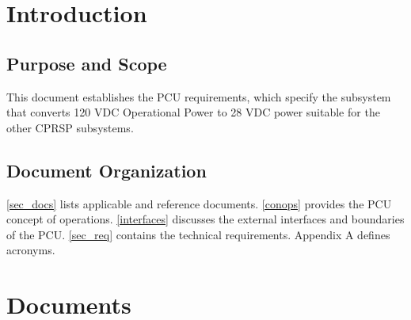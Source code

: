 













\chapter{Introduction }
\label{introduction}

\section{Purpose and Scope }
\label{purposeandscope}

This document establishes the \gls{PCU} requirements, which specify the subsystem that converts 120 \gls{VDC} Operational Power to 28 \gls{VDC} power suitable for the other \gls{CPRSP} subsystems.

\section{Document Organization }
\label{documentorganization}

\autoref{sec_docs} lists applicable and reference documents. \autoref{conops} provides the \gls{PCU} concept of operations. \autoref{interfaces} discusses the external interfaces and boundaries of the \gls{PCU}. \autoref{sec_req} contains the technical requirements. Appendix A defines acronyms.

\chapter{Documents  }
\label{sec_docs}

